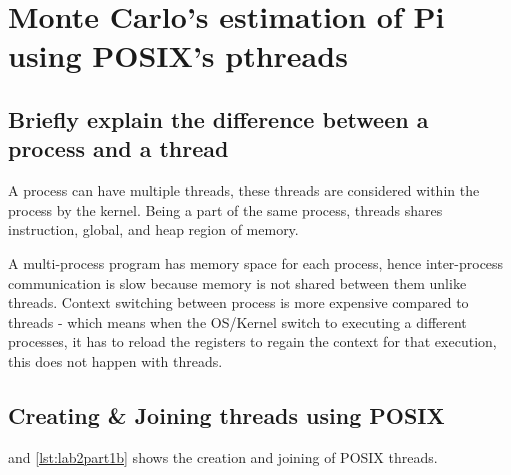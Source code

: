
\section{Monte Carlo's estimation of Pi using POSIX's pthreads}

\subsection{Briefly explain the difference between a process and a thread}

A process can have multiple threads, these threads are considered within the process by the kernel.
Being a part of the same process, threads shares instruction, global, and heap region of memory.

A multi-process program has memory space for each process, hence inter-process communication is slow
because memory is not shared between them unlike threads. Context switching between process is more
expensive compared to threads - which means when the OS/Kernel switch to executing a different processes,
it has to reload the registers to regain the context for that execution, this does not happen with threads.


\subsection{Creating \& Joining threads using POSIX}

 and \cref{lst:lab2part1b} shows the creation and joining of POSIX threads.

\vspace{0.5cm}


\vspace{0.5cm}


